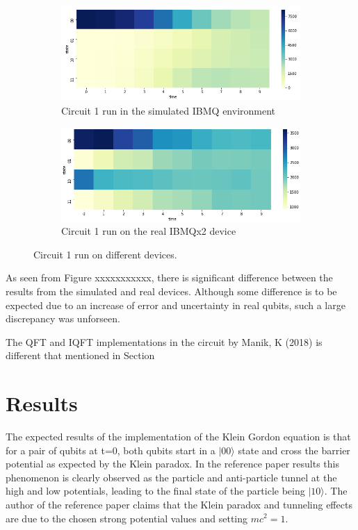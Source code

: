 \documentclass{article}
\begin{document}
\begin{figure}
\centering
\begin{subfigure}{.5\textwidth}
  \centering
  \includegraphics[width=0.9\linewidth]{../images/circ1_heatmap_sim}
  \caption{Circuit 1 run in the simulated IBMQ environment}
  \label{fig:sub1}
\end{subfigure}%
\begin{subfigure}{.5\textwidth}
  \centering
  \includegraphics[width=0.9\linewidth]{../images/circ1_heatmap_real}
  \caption{Circuit 1 run on the real IBMQx2 device}
  \label{fig:sub2}
\end{subfigure}
\caption{Circuit 1 run on different devices.}
\label{fig:test}
\end{figure}

As seen from Figure xxxxxxxxxxx, there is significant difference between the results from the simulated and real devices. Although some difference is to be expected due to an increase of error and uncertainty in real qubits, such a large discrepancy was unforseen. 

The QFT and IQFT implementations in the circuit by Manik, K (2018) \cite{manik} is different that mentioned in Section  

\section{Results}
The expected results of the implementation of the Klein Gordon equation is that for a pair of qubits at t=0, both qubits start in a $|00\rangle$ state and cross the barrier potential as expected by the Klein paradox. In the reference paper results this phenomenon is clearly observed as the particle and anti-particle tunnel at the high and low potentials, leading to the final state of the particle being $|10\rangle$. The author of the reference paper claims that the Klein paradox and tunneling effects are due to the chosen strong potential values and setting $mc^2=1$. 
\end{document}
